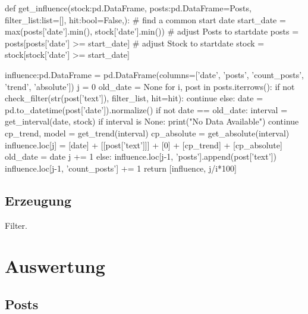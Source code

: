 \documentclass{article}
\begin{document}
\begin{python}
def get_influence(stock:pd.DataFrame, posts:pd.DataFrame=Posts, filter_list:list=[], hit:bool=False,):
    # find a common start date
    start_date = max(posts['date'].min(), stock['date'].min())
    # adjust Posts to startdate
    posts = posts[posts['date'] >= start_date]
    # adjust Stock to startdate
    stock = stock[stock['date'] >= start_date]

    influence:pd.DataFrame = pd.DataFrame(columns=['date', 'posts', 'count_posts', 'trend', 'absolute'])
    j = 0
    old_date = None
    for i, post in posts.iterrows():
        if not check_filter(str(post['text']), filter_list, hit=hit):
            continue
        else:
            date = pd.to_datetime(post['date']).normalize()
            if not date == old_date:
                interval = get_interval(date, stock)
                if interval is None:
                    print("No Data Available")
                    continue
                cp_trend, model = get_trend(interval)
                cp_absolute = get_absolute(interval)
                influence.loc[j] = [date] + [[post['text']]] + [0] + [cp_trend] + [cp_absolute]
                old_date = date
                j += 1
            else:
                influence.loc[j-1, 'posts'].append(post['text'])
                influence.loc[j-1, 'count_posts'] += 1
    return [influence, j/i*100]
\end{python}

\subsection{Erzeugung}
Filter.


\newpage

\section{Auswertung}
\subsection{Posts}
\end{document}
